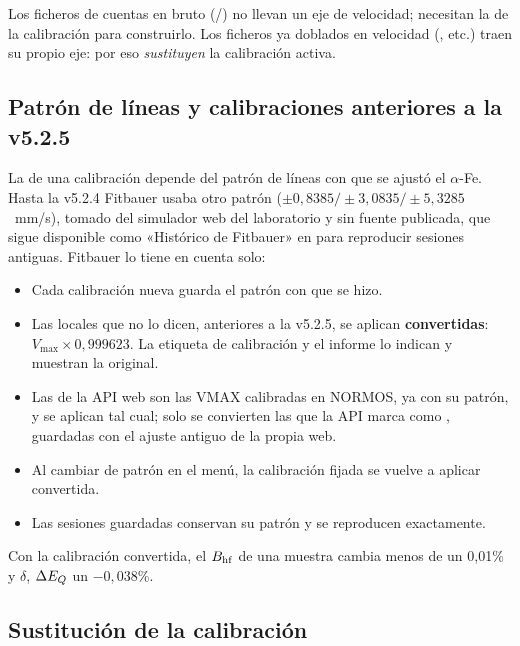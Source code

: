 \begin{nota}
Los ficheros de cuentas en bruto (/) no llevan un eje de
velocidad; necesitan la  de la calibración para construirlo. Los
ficheros ya doblados en velocidad (, etc.) traen su propio eje: por
eso \emph{sustituyen} la calibración activa.
\end{nota}


\subsection{Patrón de líneas y calibraciones anteriores a la v5.2.5}
\label{sec:calib-patron}

La  de una calibración depende del patrón de líneas con que se ajustó el
$\alpha$-Fe. Hasta la v5.2.4 Fitbauer usaba otro patrón ($\pm0{,}8385 / \pm3{,}0835 /
\pm5{,}3285$~mm/s), tomado del simulador web del laboratorio y sin fuente publicada,
que sigue disponible como «Histórico de Fitbauer» en  para reproducir sesiones antiguas. Fitbauer lo
tiene en cuenta solo:
\begin{itemize}[nosep]
  \item Cada calibración nueva guarda el patrón con que se hizo.
  \item Las locales que no lo dicen, anteriores a la v5.2.5, se aplican
        \textbf{convertidas}: $V_\text{max} \times 0{,}999623$. La etiqueta de
        calibración y el informe lo indican y muestran la  original.
  \item Las de la API web son las VMAX calibradas en NORMOS, ya con su patrón, y
        se aplican tal cual; solo se convierten las que la API marca como
        , guardadas con el ajuste antiguo de la propia web.
  \item Al cambiar de patrón en el menú, la calibración fijada se vuelve a aplicar
        convertida.
  \item Las sesiones guardadas conservan su patrón y se reproducen exactamente.
\end{itemize}
Con la calibración convertida, el $B_{\mathrm{hf}}$ de una muestra cambia menos de un
0{,}01\% y $\delta$, $\Delta E_{Q}$ un $-0{,}038\%$.


\subsection{Sustitución de la calibración}

